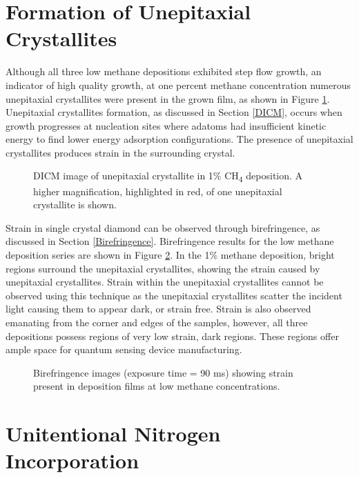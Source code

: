 \section{Formation of Unepitaxial Crystallites}
\indent

Although all three low methane depositions exhibited step flow growth, an indicator of high quality growth, at one percent methane concentration numerous unepitaxial crystallites were present in the grown film, as shown in Figure \ref{fig:UEC1percentCH4}. Unepitaxial crystallites formation, as discussed in Section \ref{DICM}, occurs when growth progresses at nucleation sites where adatoms had insufficient kinetic energy to find lower energy adsorption configurations. The presence of unepitaxial crystallites produces strain in the surrounding crystal. 

\begin{figure}
    \centering
    
    \caption{DICM image of unepitaxial crystallite in 1\% CH\textsubscript{4} deposition. A higher magnification, highlighted in red, of one unepitaxial crystallite is shown.}
    \label{fig:UEC1percentCH4}
\end{figure}

Strain in single crystal diamond can be observed through birefringence, as discussed in Section \ref{Birefringence}. Birefringence results for the low methane deposition series are shown in Figure \ref{fig:BirefringenceLowCH4}. In the 1\% methane deposition, bright regions surround the unepitaxial crystallites, showing the strain caused by unepitaxial crystallites. Strain within the unepitaxial crystallites cannot be observed using this technique as the unepitaxial crystallites scatter the incident light causing them to appear dark, or strain free. Strain is also observed emanating from the corner and edges of the samples, however, all three depositions possess regions of very low strain, dark regions. These regions offer ample space for quantum sensing device manufacturing. 

\begin{figure}
    \centering
    
    \caption{Birefringence images (exposure time = 90 ms) showing strain present in deposition films at low methane concentrations.}
    \label{fig:BirefringenceLowCH4}
\end{figure}

\section{Unitentional Nitrogen Incorporation}
\indent

